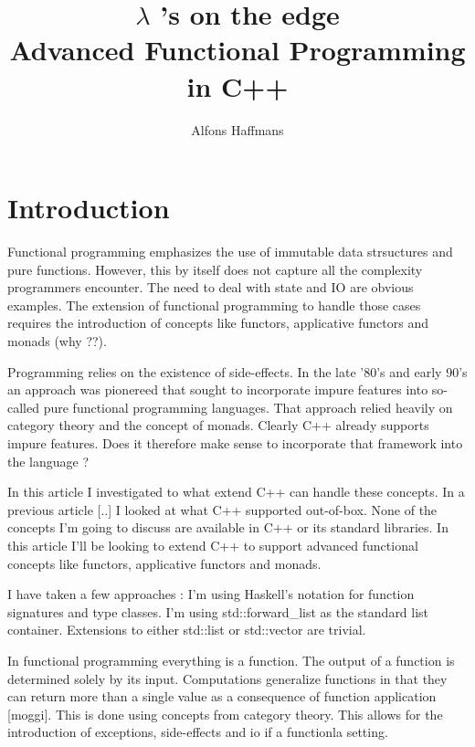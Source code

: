 \documentclass[12pt,fleqn]{article}
\begin{document}
\title{$\lambda$ 's on the edge \\ Advanced Functional Programming in C++}
\author {Alfons Haffmans}
\maketitle
\section* {Introduction}

  
Functional programming emphasizes the use of immutable data strsuctures and pure functions.
However, this by itself does not capture all the complexity programmers encounter.
The need to deal with state and IO are obvious examples.
The extension of functional programming to handle those cases requires the introduction of concepts like functors, applicative functors and monads (why ??).


Programming relies on the existence of side-effects.
In the late '80's and early 90's an approach was pionereed that sought to incorporate impure features into so-called pure functional programming languages.
That approach relied heavily on category theory and the concept of monads.
Clearly C++ already supports impure features.
Does it therefore make sense to incorporate that framework into the language ?


In this article I investigated to what extend C++ can handle these concepts.
In a previous article [..] I looked at what C++ supported out-of-box.
None of the concepts I'm going to discuss are available in C++ or its standard libraries.
In this article I'll be looking to extend C++ to support advanced functional concepts like functors, applicative functors and monads.


I have taken a few approaches :
I'm using Haskell's notation for function signatures and type classes.
I'm using std::forward\_list as the standard list container. Extensions to either std::list or std::vector are trivial.

In functional programming everything is a function.
The output of a function is determined solely by its input.
Computations generalize functions in that they can return more than a single value as a consequence of function application [moggi].
This is done using concepts from category theory.
This allows for the introduction of exceptions, side-effects and io if a functionla setting.
\end{document}
